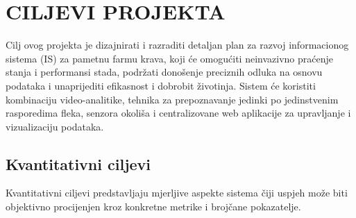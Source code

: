\documentclass{article}
\begin{document}
\newpage
\section{CILJEVI PROJEKTA}

Cilj ovog projekta je dizajnirati i razraditi detaljan plan za razvoj informacionog sistema (IS) za pametnu farmu krava, koji će omogućiti neinvazivno praćenje stanja i performansi stada, podržati donošenje preciznih odluka na osnovu podataka i unaprijediti efikasnost i dobrobit životinja. Sistem će koristiti kombinaciju video-analitike, tehnika za prepoznavanje jedinki po jedinstvenim rasporedima fleka, senzora okoliša i centralizovane web aplikacije za upravljanje i vizualizaciju podataka.

\subsection{Kvantitativni ciljevi}

Kvantitativni ciljevi predstavljaju mjerljive aspekte sistema čiji uspjeh može biti objektivno procijenjen kroz konkretne metrike i brojčane pokazatelje.
\end{document}
